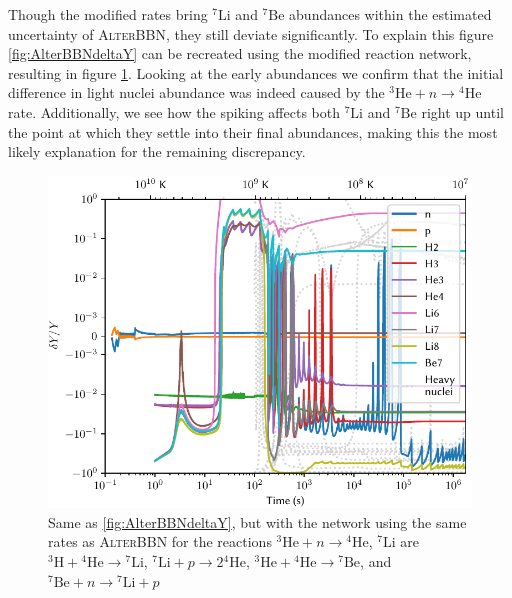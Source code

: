 Though the modified rates bring ${}^7\text{Li}$ and ${}^7\text{Be}$ abundances within the estimated uncertainty of \textsc{AlterBBN}, they still deviate significantly. To explain this figure \ref{fig:AlterBBNdeltaY} can be recreated using the modified reaction network, resulting in figure \ref{fig:AlterratesBBNdeltaY}. Looking at the early abundances we confirm that the initial difference in light nuclei abundance was indeed caused by the ${}^3\text{He}+n\rightarrow {}^4\text{He}$ rate. Additionally, we see how the spiking affects both ${}^7\text{Li}$ and ${}^7\text{Be}$ right up until the point at which they settle into their final abundances, making this the most likely explanation for the remaining discrepancy.

\begin{figure}[ht]
    \includegraphics[width=5.1in]{figures/AlterratesBBNdeltaY.pdf}
    \caption{Same as \cref{fig:AlterBBNdeltaY}, but with the network using the same rates as \textsc{AlterBBN} for the reactions ${}^3\text{He}+n\rightarrow {}^4\text{He}$, ${}^7\text{Li}$ are ${}^3\text{H}+{}^4\text{He}\rightarrow {}^7\text{Li}$, ${}^7\text{Li} + p\rightarrow 2{}^4\text{He}$, ${}^3\text{He}+{}^4\text{He}\rightarrow {}^7\text{Be}$, and ${}^7\text{Be} + n\rightarrow {}^7\text{Li} + p$}
    \label{fig:AlterratesBBNdeltaY}
\end{figure}



